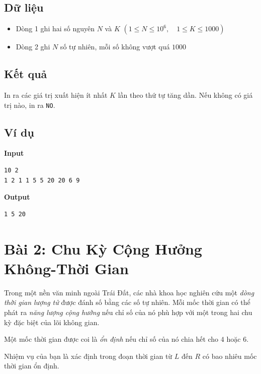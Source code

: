 \subsection*{Dữ liệu}

\begin{itemize}
    \item Dòng 1 ghi hai số nguyên $N$ và $K$ $(1 \le N \le 10^6,\quad 1 \le K \le 1000)$
    \item Dòng 2 ghi $N$ số tự nhiên, mỗi số không vượt quá $1000$
\end{itemize}

\subsection*{Kết quả}

In ra các giá trị xuất hiện ít nhất $K$ lần theo thứ tự tăng dần.
Nếu không có giá trị nào, in ra \texttt{NO}.

\subsection*{Ví dụ}

\noindent
\begin{minipage}[t]{0.48\textwidth}
\textbf{Input}
\begin{verbatim}
10 2
1 2 1 1 5 5 20 20 6 9
\end{verbatim}
\end{minipage}
\hfill
\begin{minipage}[t]{0.48\textwidth}
\textbf{Output}
\begin{verbatim}
1 5 20
\end{verbatim}
\end{minipage}

\bigskip

\section*{Bài 2: Chu Kỳ Cộng Hưởng Không-Thời Gian}

Trong một nền văn minh ngoài Trái Đất, các nhà khoa học nghiên cứu một \emph{dòng thời gian lượng tử} được đánh số bằng các số tự nhiên.
Mỗi mốc thời gian có thể phát ra \emph{năng lượng cộng hưởng} nếu chỉ số của nó phù hợp với một trong hai chu kỳ đặc biệt của lõi không gian.

Một mốc thời gian được coi là \emph{ổn định} nếu chỉ số của nó chia hết cho $4$ hoặc $6$.

Nhiệm vụ của bạn là xác định trong đoạn thời gian từ $L$ đến $R$ có bao nhiêu mốc thời gian ổn định.

